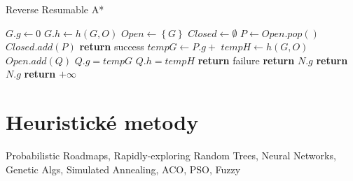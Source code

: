 \begin{algorithm}[H]
	\caption{Reverse Resumable A*}
	\label{alg:RRA}
	\begin{algorithmic}[1]
			\State $G.g\gets 0$
			\State $G.h\gets h(G,O)$
			\State $Open\gets\left\{ G \right\}$
			\State $Closed\gets\emptyset$
			\State {}
		\EndFunction
		\Statex
				\State $P\gets Open.pop()$
				\State $Closed.add(P)$
					\State \textbf{return} success
				\EndIf
					\State $tempG\gets P.g+$ 
					\State $tempH\gets h(G,O)$
						\State $Open.add(Q)$
					\EndIf
						\State $Q.g=tempG$
						\State $Q.h=tempH$
					\EndIf
				\EndFor
			\EndWhile
			\State \textbf{return} failure
		\EndFunction
		\Statex
				\State \textbf{return} $N.g$
			\EndIf
				\State \textbf{return} $N.g$
			\EndIf
			\State \textbf{return} $+\infty$
		\EndFunction
	\end{algorithmic}
\end{algorithm}
 
\section{Heuristické metody}
Probabilistic Roadmaps, Rapidly-exploring Random Trees, Neural Networks, Genetic Algs, Simulated Annealing, ACO, PSO, Fuzzy


